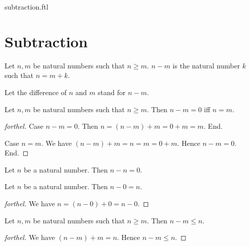\documentclass{naproche-library}
\begin{document}
\begin{smodule}{subtraction.ftl}

  \section*{Subtraction}

  \begin{definition}[forthel,id=ARITHMETIC_05_8878757276286976]
    Let $n, m$ be natural numbers such that $n \geq m$.
    $n - m$ is the natural number $k$ such that $n = m + k$.

    Let the difference of $n$ and $m$ stand for $n - m$.
  \end{definition}

  \begin{proposition}[forthel,id=ARITHMETIC_05_874271710642176]
    Let $n, m$ be natural numbers such that $n \geq m$.
    Then $n - m = 0$ iff $n = m$.
  \end{proposition}
  \begin{proof}[forthel]
    Case $n - m = 0$.
      Then $n
        = (n - m) + m
        = 0 + m
        = m$.
    End.

    Case $n = m$.
      We have $(n - m) + m
        = n
        = m
        = 0 + m$.
      Hence $n - m = 0$.
    End.
  \end{proof}

  \begin{corollary}[forthel,id=ARITHMETIC_05_8457713057005568]
    Let $n$ be a natural number.
    Then $n - n = 0$.
  \end{corollary}

  \begin{proposition}[forthel,id=ARITHMETIC_05_8518521570983936]
    Let $n$ be a natural number.
    Then $n - 0 = n$.
  \end{proposition}
  \begin{proof}[forthel]
    We have $n
      = (n - 0) + 0
      = n - 0$.
  \end{proof}

  \begin{proposition}[forthel,id=ARITHMETIC_05_4222566117933056]
    Let $n, m$ be natural numbers such that $n \geq m$.
    Then $n - m \leq n$.
  \end{proposition}
  \begin{proof}[forthel]
    We have $(n - m) + m = n$.
    Hence $n - m \leq n$.
  \end{proof}


\end{smodule}
\end{document}
